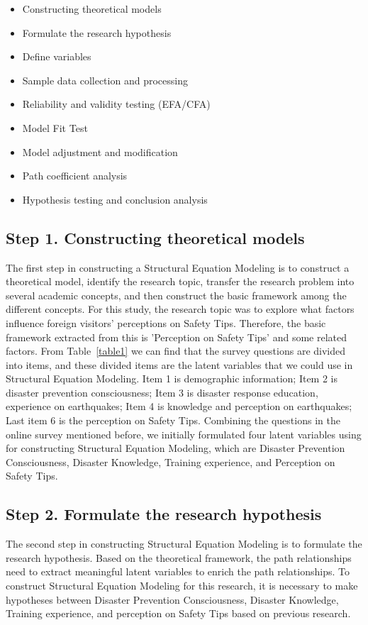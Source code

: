 \begin{itemize}
\item Constructing theoretical models
\item Formulate the research hypothesis
\item Define variables
\item Sample data collection and processing
\item Reliability and validity testing (EFA/CFA)
\item Model Fit Test
\item Model adjustment and modification
\item Path coefficient analysis
\item Hypothesis testing and conclusion analysis
\end{itemize}

\subsection{Step 1. Constructing theoretical models}
The first step in constructing a Structural Equation Modeling is to construct a theoretical model, identify the research topic, transfer the research problem into several academic concepts, and then construct the basic framework among the different concepts. For this study, the research topic was to explore what factors influence foreign visitors' perceptions on Safety Tips. Therefore, the basic framework extracted from this is 'Perception on Safety Tips' and some related factors. From Table~\ref{table1} we can find that the survey questions are divided into items, and these divided items are the latent variables that we could use in Structural Equation Modeling. Item 1 is demographic information; Item 2 is disaster prevention consciousness; Item 3 is disaster response education, experience on earthquakes; Item 4 is knowledge and perception on earthquakes; Last item 6 is the perception on Safety Tips. Combining the questions in the online survey mentioned before, we initially formulated four latent variables using for constructing Structural Equation Modeling, which are Disaster Prevention Consciousness, Disaster Knowledge, Training experience, and Perception on Safety Tips.

\subsection{Step 2. Formulate the research hypothesis}
The second step in constructing Structural Equation Modeling is to formulate the research hypothesis. Based on the theoretical framework, the path relationships need to extract meaningful latent variables to enrich the path relationships. To construct Structural Equation Modeling for this research, it is necessary to make hypotheses between Disaster Prevention Consciousness, Disaster Knowledge, Training experience, and perception on Safety Tips based on previous research. 


